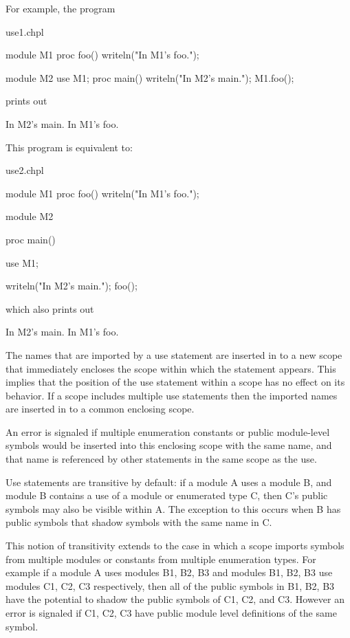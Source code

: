For example, the program
\begin{chapelexample}{use1.chpl}
\begin{chapel}
module M1 {
  proc foo() {
    writeln("In M1's foo.");
  }
}

module M2 {
  use M1;
  proc main() {
    writeln("In M2's main.");
    M1.foo();
  }
}
\end{chapel}
prints out
\begin{chapelprintoutput}{}
In M2's main.
In M1's foo.
\end{chapelprintoutput}
\end{chapelexample}

This program is equivalent to:
\begin{chapelexample}{use2.chpl}
\begin{chapel}
module M1 {
  proc foo() {
    writeln("In M1's foo.");
  }
}

module M2 {
  proc main() {
    use M1;

    writeln("In M2's main.");
    foo();
  }
}
\end{chapel}

which also prints out
\begin{chapelprintoutput}{}
In M2's main.
In M1's foo.
\end{chapelprintoutput}
\end{chapelexample}

The names that are imported by a use statement are inserted in to a
new scope that immediately encloses the scope within which the
statement appears.  This implies that the position of the use
statement within a scope has no effect on its behavior.  If a scope
includes multiple use statements then the imported names are inserted
in to a common enclosing scope.

An error is signaled if multiple enumeration constants or public module-level
symbols would be inserted into this enclosing scope with the same name, and
that name is referenced by other statements in the same scope as the use.


Use statements are transitive by default: if a module A uses a module
B, and module B contains a use of a module or enumerated type C, then
C's public symbols may also be visible within A.  The exception to
this occurs when B has public symbols that shadow symbols with the
same name in C.

This notion of transitivity extends to the case in which a scope
imports symbols from multiple modules or constants from multiple
enumeration types.  For example if a module A uses modules B1, B2, B3
and modules B1, B2, B3 use modules C1, C2, C3 respectively, then all
of the public symbols in B1, B2, B3 have the potential to shadow the
public symbols of C1, C2, and C3.  However an error is signaled if
C1, C2, C3 have public module level definitions of the same symbol.

